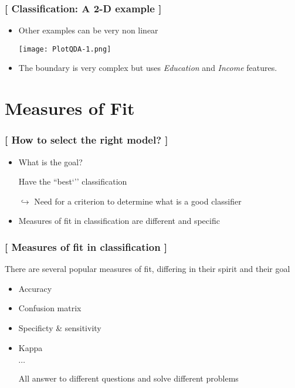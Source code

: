 \documentclass[xcolor=x11names,compress, handhouts]{beamer}
\renewcommand{\(}{\begin{columns}}
\renewcommand{\)}{\end{columns}}
\newcommand{\<}[1]{\begin{column}{#1}}
\renewcommand{\>}{\end{column}}
\begin{document}
\begin{frame} %
\frametitle{\textcolor{brique}{[ Classification:  A 2-D example ]}}
\pause
\begin{itemize}[<+->]
  \item Other examples can be very non linear
  \item[] \begin{center}\texttt{[image: PlotQDA-1.png]} \end{center}
  \item The boundary is very complex but uses \textit{Education}  and \textit{Income} features.
\end{itemize}
\end{frame}



\section{Measures of Fit}

\begin{frame} %
\frametitle{\textcolor{brique}{[ How to select the right model?  ]}}
\pause
\begin{itemize}[<+->]
  \item What is the goal?
  \item[] Have the ``best`'' classification
  \item[$\hookrightarrow$] Need for a criterion to determine what is a good classifier
  \item Measures of fit in classification are different and specific
\end{itemize}
\end{frame}

\begin{frame} %
\frametitle{\textcolor{brique}{[ Measures of fit in classification ]}}
There are several popular measures of fit, differing in their spirit and their goal
\pause
\begin{itemize}[<+->]
  \item Accuracy
  \item Confusion matrix
  \item Specificty \& sensitivity
  \item Kappa
  \item[]$\cdots$
  \item[] All answer to different questions and solve different problems
\end{itemize}
\end{frame}
\end{document}
